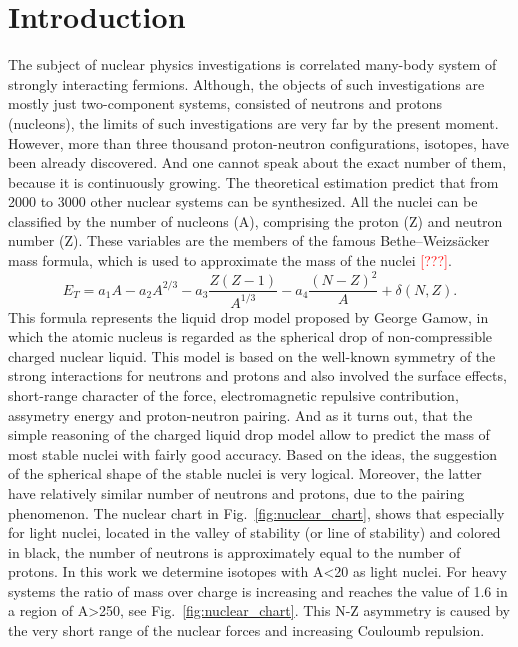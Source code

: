 \section{Introduction}

The subject of nuclear physics investigations is correlated many-body system of strongly interacting fermions. 
Although, the objects of such investigations are mostly just two-component systems, consisted of neutrons and protons (nucleons), the limits of such investigations are very far by the present moment.
However, more than three thousand proton-neutron configurations, isotopes, have been already discovered.
And one cannot speak about the exact number of them, because it is continuously growing. 
The theoretical estimation predict that from 2000 to 3000 other nuclear systems can be synthesized.  
All the nuclei can be classified by the number of nucleons (A), comprising the proton (Z) and neutron number (Z). 
These variables are the members of the famous Bethe–Weizs{\"a}cker mass formula, which is used to approximate the mass of the nuclei \textcolor{red}{[???]}.
\begin{equation}
	E_{T} = a_{1}A - a_{2}A^{2/3} - a_{3}\frac{Z(Z-1)}{A^{1/3}} - a_{4}\frac{(N-Z)^2}{A} + \delta(N,Z).
	\label{eq:BetheWeizs}
\end{equation}
This formula represents the liquid drop model proposed by George Gamow, in which the atomic nucleus is regarded as the spherical drop of non-compressible charged nuclear liquid.
This model is based on the well-known symmetry of the strong interactions for neutrons and protons and also involved the surface effects, short-range character of the force, electromagnetic repulsive contribution, assymetry energy and proton-neutron pairing.
And as it turns out, that the simple reasoning of the charged liquid drop model allow to predict the mass of most stable nuclei with fairly good accuracy.
Based on the ideas, the suggestion of the spherical shape of the stable nuclei is very logical.
Moreover, the latter have relatively similar number of neutrons and protons, due to the pairing phenomenon.
The nuclear chart in Fig.\ \ref{fig:nuclear_chart}, shows that especially for light nuclei, located in the valley of stability (or line of stability) and colored in black, the number of neutrons is approximately equal to the number of protons.
In this work we determine isotopes with A<20 as light nuclei.
For heavy systems the ratio of mass over charge is increasing and reaches the value of 1.6 in a region of A>250, see Fig.\ \ref{fig:nuclear_chart}.
This N-Z asymmetry is caused by the very short range of the nuclear forces and increasing Couloumb repulsion.

